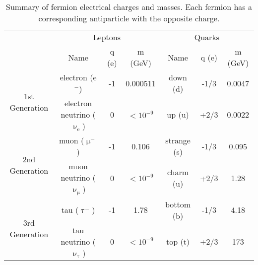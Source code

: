 \begin{table}
    \small
    \centering
    \caption{Summary of fermion electrical charges and masses. Each fermion has a corresponding antiparticle with the opposite charge.}
    \begin{tabular} {ccccccc}
         & \multicolumn{3}{c}{Leptons} & \multicolumn{3}{c}{Quarks} \\
        & Name & q (e) & m (GeV) & Name & q (e) & m (GeV)  \\
        \hline
        \multirow{2}{1.85cm}{1st Generation} & electron (e$^{-}$) & -1 & 0.000511 & down (d) & -1/3 & 0.0047 \\
        & electron neutrino ($\upnu_\mathrm{e}$) & 0 & $<10^{-9}$ & up (u) & +2/3 & 0.0022 \\
        \hline
        \multirow{2}{1.85cm}{2nd Generation} & muon ($\upmu^{-}$) & -1 & 0.106 & strange (s) & -1/3 & 0.095 \\
        & muon neutrino ($\upnu_\upmu$) & 0 & $<10^{-9}$ & charm (u) & +2/3 & 1.28 \\
        \hline
        \multirow{2}{1.85cm}{3rd Generation} & tau ($\uptau^{-}$) & -1 & 1.78 & bottom (b) & -1/3 & 4.18 \\
        & tau neutrino ($\upnu_\uptau$) & 0 & $<10^{-9}$ & top (t) & +2/3 & 173 \\
        \hline
    \end{tabular}
    \label{tab:fermion}
\end{table}